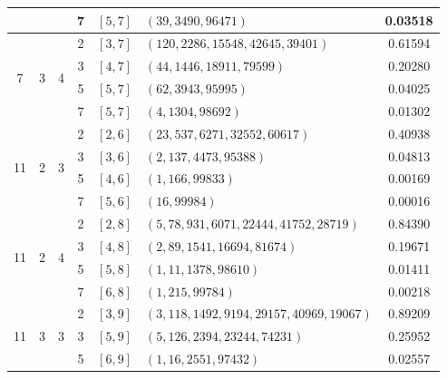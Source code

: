 \documentclass[a4paper,11pt,reqno]{article}
\theoremstyle{plain} \numberwithin{equation}{section}
\theoremstyle{definition}
\begin{document}
\begin{appendices}
\begin{table}[!ht]
\begin{tabular}{|c|c|c|c|c|l|c|}
                    &                    &                    & 7   & $[5, 7]$ & $(39, 3490, 96471)$ & 0.03518 \\
\hline
\multirow{4}{*}{7}  & \multirow{4}{*}{3} & \multirow{4}{*}{4} 
                    & 2   & $[3, 7]$ & $(120, 2286, 15548, 42645, 39401)$ & 0.61594 \\
                    &                    &                    & 3   & $[4, 7]$ & $(44, 1446, 18911, 79599)$ & 0.20280 \\
                    &                    &                    & 5   & $[5, 7]$ & $(62, 3943, 95995)$ & 0.04025 \\
                    &                    &                    & 7   & $[5, 7]$ & $(4, 1304, 98692)$ & 0.01302 \\
\hline
\multirow{4}{*}{11} & \multirow{4}{*}{2} & \multirow{4}{*}{3} 
                    & 2   & $[2, 6]$ & $(23, 537, 6271, 32552, 60617)$ & 0.40938 \\
                    &                    &                    & 3   & $[3, 6]$ & $(2, 137, 4473, 95388)$ & 0.04813 \\
                    &                    &                    & 5   & $[4, 6]$ & $(1, 166, 99833)$ & 0.00169 \\
                    &                    &                    & 7   & $[5, 6]$ & $(16, 99984)$ & 0.00016 \\
\hline
\multirow{4}{*}{11} & \multirow{4}{*}{2} & \multirow{4}{*}{4} 
                    & 2   & $[2, 8]$ & $(5, 78, 931, 6071, 22444, 41752, 28719)$ & 0.84390 \\
                    &                    &                    & 3   & $[4, 8]$ & $(2, 89, 1541, 16694, 81674)$ & 0.19671 \\
                    &                    &                    & 5   & $[5, 8]$ & $(1, 11, 1378, 98610)$ & 0.01411 \\
                    &                    &                    & 7   & $[6, 8]$ & $(1, 215, 99784)$ & 0.00218 \\
\hline
\multirow{4}{*}{11} & \multirow{4}{*}{3} & \multirow{4}{*}{3} 
                    & 2   & $[3, 9]$ & $(3, 118, 1492, 9194, 29157, 40969, 19067)$ & 0.89209 \\
                    &                    &                    & 3   & $[5, 9]$ & $(5, 126, 2394, 23244, 74231)$ & 0.25952 \\
                    &                    &                    & 5   & $[6, 9]$ & $(1, 16, 2551, 97432)$ & 0.02557 \\

\end{tabular}
\end{table}
\end{appendices}
\end{document}
